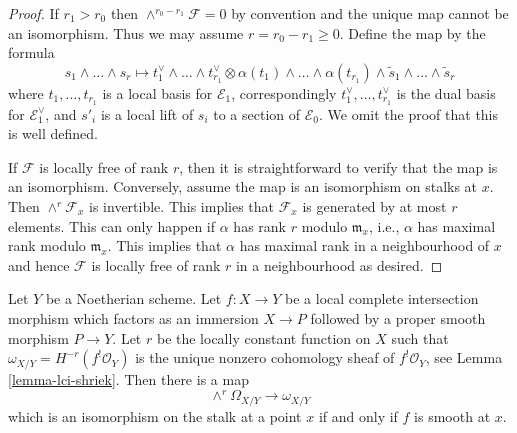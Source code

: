 \begin{proof}
If $r_1 > r_0$ then $\wedge^{r_0 - r_1}\mathcal{F} = 0$ by convention
and the unique map cannot be an isomorphism. Thus we may assume
$r = r_0 - r_1 \geq 0$. Define the map by the formula
$$
s_1 \wedge \ldots \wedge s_r \mapsto
t_1^\vee \wedge \ldots \wedge t_{r_1}^\vee \otimes
\alpha(t_1) \wedge \ldots \wedge \alpha(t_{r_1}) \wedge
\tilde s_1 \wedge \ldots \wedge \tilde s_r
$$
where $t_1, \ldots, t_{r_1}$ is a local basis for $\mathcal{E}_1$,
correspondingly
$t_1^\vee, \ldots, t_{r_1}^\vee$ is the dual basis for $\mathcal{E}_1^\vee$,
and $s'_i$ is a local lift of $s_i$ to a section of $\mathcal{E}_0$.
We omit the proof that this is well defined.

\medskip\noindent
If $\mathcal{F}$ is locally free of rank $r$, then it is straightforward
to verify that the map is an isomorphism. Conversely, assume the map
is an isomorphism on stalks at $x$. Then $\wedge^r\mathcal{F}_x$
is invertible. This implies that $\mathcal{F}_x$ is generated by
at most $r$ elements. This can only happen if $\alpha$ has rank
$r$ modulo $\mathfrak m_x$, i.e., $\alpha$ has maximal rank modulo
$\mathfrak m_x$. This implies that $\alpha$ has maximal rank
in a neighbourhood of $x$ and hence $\mathcal{F}$ is locally free
of rank $r$ in a neighbourhood as desired.
\end{proof}

\begin{lemma}
\label{lemma-fundamental-class-lci}
Let $Y$ be a Noetherian scheme. Let $f : X \to Y$ be a
local complete intersection morphism which factors
as an immersion $X \to P$ followed by a proper smooth morphism $P \to Y$.
Let $r$ be the locally constant function on
$X$ such that $\omega_{X/Y} = H^{-r}(f^!\mathcal{O}_Y)$
is the unique nonzero cohomology sheaf of $f^!\mathcal{O}_Y$, see
Lemma \ref{lemma-lci-shriek}.
Then there is a map
$$
\wedge^r\Omega_{X/Y} \longrightarrow \omega_{X/Y}
$$
which is an isomorphism on the stalk at a point $x$ if and only
if $f$ is smooth at $x$.
\end{lemma}

